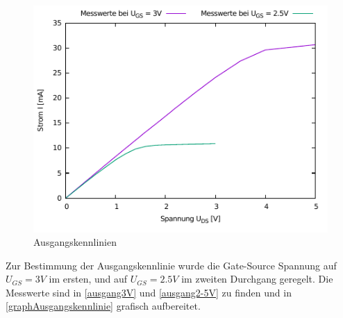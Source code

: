\documentclass[11pt, a4paper]{article}
\begin{document}
\begin{figure}[H]
    \centering
    \includegraphics[width=\linewidth]{ausgang.pdf}
    \caption{Ausgangskennlinien}
    \label{graphAusgangskennlinie}
\end{figure}
Zur Bestimmung der Ausgangskennlinie wurde die Gate-Source Spannung auf $U_{GS} = 3 V$ im ersten, und auf $U_{GS} = 2.5 V$ im zweiten Durchgang geregelt. Die Messwerte sind in \autoref{ausgang3V} und \autoref{ausgang2-5V} zu finden und in \autoref{graphAusgangskennlinie} grafisch aufbereitet.
\end{document}
